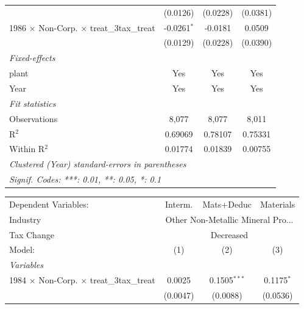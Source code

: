 \documentclass[
  12pt]{article}
\theoremstyle{definition}
\theoremstyle{remark}
\begin{document}
\begin{table}
\begin{minipage}{\linewidth}
\begin{tabular}{lccc}
                                                           & (0.0126)        & (0.0228)   & (0.0381)\\   
   1986 $\times$ Non-Corp. $\times$ treat\_3tax\_treat     & -0.0261$^{*}$   & -0.0181    & 0.0509\\   
                                                           & (0.0129)        & (0.0228)   & (0.0390)\\   
   \midrule
   \emph{Fixed-effects}\\
   plant                                                   & Yes             & Yes        & Yes\\  
   Year                                                    & Yes             & Yes        & Yes\\  
   \midrule
   \emph{Fit statistics}\\
   Observations                                            & 8,077           & 8,077      & 8,011\\  
   R$^2$                                                   & 0.69069         & 0.78107    & 0.75331\\  
   Within R$^2$                                            & 0.01774         & 0.01839    & 0.00755\\  
   \midrule \midrule
   \multicolumn{4}{l}{\emph{Clustered (Year) standard-errors in parentheses}}\\
   \multicolumn{4}{l}{\emph{Signif. Codes: ***: 0.01, **: 0.05, *: 0.1}}\\
\end{tabular}
\par\endgroup
\begingroup
\centering
\begin{tabular}{lccc}
   \tabularnewline \midrule \midrule
   Dependent Variables:                                    & Interm.        & Mats+Deduc     & Materials\\  
   Industry & \multicolumn{3}{c}{Other Non-Metallic Mineral Pro...} \\ 
   Tax Change & \multicolumn{3}{c}{Decreased} \\ 
   Model:                                                  & (1)            & (2)            & (3)\\  
   \midrule
   \emph{Variables}\\
   1984 $\times$ Non-Corp. $\times$ treat\_3tax\_treat     & 0.0025         & 0.1505$^{***}$ & 0.1175$^{*}$\\   
                                                           & (0.0047)       & (0.0088)       & (0.0536)\\   

\end{tabular}
\end{minipage}
\end{table}
\end{document}
